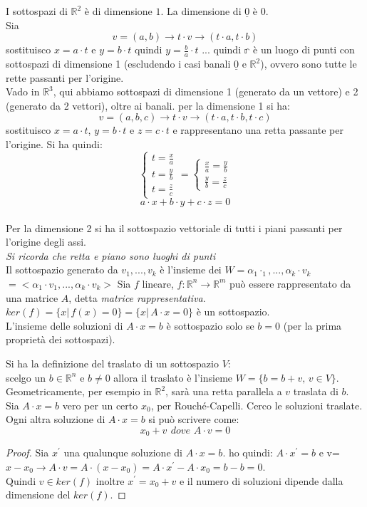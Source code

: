 \documentclass[a4paper,12pt, oneside]{book}
\begin{document}
I sottospazi di $\mathbb{R}^2$ è di dimensione $1$. La dimensione di $\underline{0}$ è $0$.\\
Sia $$v=(a,b)\rightarrow t\cdot v\rightarrow (t\cdot a , t\cdot b)$$ sostituisco $x=a\cdot t$ e $y=b\cdot t$ quindi $y=\frac{b}{a}\cdot t$ ... quindi $\mathbb{r}$ è un luogo di punti con sottospazi di dimensione 1 (escludendo i casi banali $\underline{0}$ e $\mathbb{R}^2$), ovvero sono tutte le rette passanti per l'origine. \\
Vado in $\mathbb{R}^3$, qui abbiamo sottospazi di dimensione 1 (generato da un vettore) e 2 (generato da 2 vettori), oltre ai banali.
per la dimensione 1 si ha:
$$v=(a,b,c)\rightarrow t\cdot v\rightarrow (t\cdot a , t\cdot b, t\cdot c)$$sostituisco $x=a\cdot t$, $y=b\cdot t$ e $z=c\cdot t$ e rappresentano una retta passante per l'origine. Si ha quindi:
$$
\begin{cases}
t=\frac{x}{a}\\
t=\frac{y}{b}\\
t=\frac{z}{c}
\end{cases}=
\begin{cases}
\frac{x}{a}=\frac{y}{b}\\
\frac{y}{b}=\frac{z}{c}
\end{cases}$$ 
$$a\cdot x+b\cdot y+c\cdot z=0$$\\
Per la dimensione 2 si ha il sottospazio vettoriale di tutti i piani passanti per l'origine degli assi. \\
\textit{Si ricorda che retta e piano sono luoghi di punti}\\
Il sottospazio generato da $v_1,...,v_k$ è l'insieme dei $W=\alpha_1\cdot _1,...,\alpha_k\cdot v_k$\\$=<\alpha_1\cdot v_1,...,\alpha_k\cdot v_k>$
\newpage
Sia $f$ lineare, $f:\mathbb{R}^n\rightarrow\mathbb{R}^m$ può essere rappresentato da una matrice $A$, detta \textit{matrice rappresentativa}. $ker(f)=\{x|\,f(x)=0\}=\{x|\,A\cdot x=0\}$ è un sottospazio.\\
L'insieme delle soluzioni di $A\cdot x=b$ è sottospazio solo se $b=0$ (per la prima proprietà dei sottospazi).\\
\begin{definizione}
Si ha la definizione del traslato di un sottospazio $V$:\\
scelgo un $b\in \mathbb{R}^n$ e $b\neq 0$ allora il traslato è l'insieme $W=\{b=b+v,\,v\in V\}$. Geometricamente, per esempio in $\mathbb{R}^2$, sarà una retta parallela a $v$ traslata di $b$.\\
Sia $A\cdot x=b$ vero per un certo $x_0$, per Rouché-Capelli. Cerco le soluzioni traslate.
Ogni altra soluzione di $A\cdot x=b$  si può scrivere come:
$$x_0+v\,\ dove\,\, A\cdot v =0$$
\end{definizione}
\begin{proof}
Sia $x^{'}$ una qualunque soluzione di $A\cdot x=b$. ho quindi: $A\cdot x^{'}=b$  e v=$x-x_0\rightarrow A\cdot v= A\cdot(x-x_0)=A\cdot x^{'}-A\cdot x_0=b-b=0$.\\
Quindi $v\in ker(f)$ inoltre $x^{'}=x_0+v$ e il numero di soluzioni dipende dalla dimensione del $ker(f)$.
\end{proof}
\end{document}
